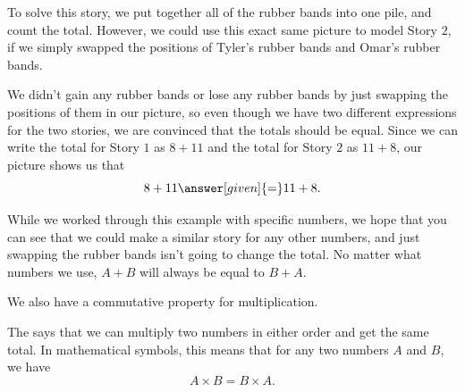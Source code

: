 \documentclass{ximera}
\begin{document}
\begin{example}
\begin{image}
\end{image}
To solve this story, we put together all of the rubber bands into one pile, and count the total. However, we could use this exact same picture to model Story $2$, if we simply swapped the positions of Tyler's rubber bands and Omar's rubber bands.
\begin{image}
\end{image}
We didn't gain any rubber bands or lose any rubber bands by just swapping the positions of them in our picture, so even though we have two different expressions for the two stories, we are convinced that the totals should be equal. Since we can write the total for Story $1$ as $8+11$ and the total for Story $2$ as $11+8$, our picture shows us that
\[
8+11 \answer[given]{=} 11 + 8.
\]

\end{example}
While we worked through this example with specific numbers, we hope that you can see that we could make a similar story for any other numbers, and just swapping the rubber bands isn't going to change the total. No matter what numbers we use, $A+B$ will always be equal to $B+A$. 

We also have a commutative property for multiplication.

\begin{definition}
The  says that we can multiply two numbers in either order and get the same total. In mathematical symbols, this means that for any two numbers $A$ and $B$, we have
\[
A \times B = B \times A.
\]
\end{definition}
\end{document}

